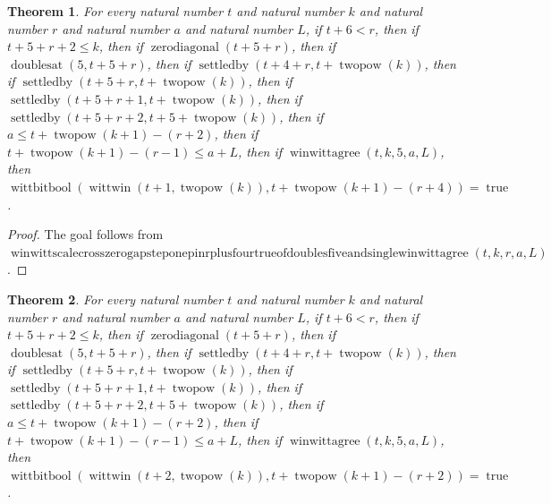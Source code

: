 \documentclass[11pt]{article}
\newtheorem{theorem}{Theorem}[section]
\theoremstyle{definition}
\begin{document}
\begin{theorem}
\label{ll:paper:winwitt-scale-cross-zero-gap-step-one-pin-r-plus-four-true-of-doubles-five-and-single-winwittagree}
For every natural number \(t\) and natural number \(k\) and natural number \(r\) and natural number \(a\) and natural number \(L\), if \(t + 6 < r\), then if \(t + 5 + r + 2 \le k\), then if \(\operatorname{zerodiagonal}(t + 5 + r)\), then if \(\operatorname{doublesat}(5, t + 5 + r)\), then if \(\operatorname{settledby}(t + 4 + r, t + \operatorname{twopow}(k))\), then if \(\operatorname{settledby}(t + 5 + r, t + \operatorname{twopow}(k))\), then if \(\operatorname{settledby}(t + 5 + r + 1, t + \operatorname{twopow}(k))\), then if \(\operatorname{settledby}(t + 5 + r + 2, t + 5 + \operatorname{twopow}(k))\), then if \(a \le t + \operatorname{twopow}(k + 1) - (r + 2)\), then if \(t + \operatorname{twopow}(k + 1) - (r - 1) \le a + L\), then if \(\operatorname{winwittagree}(t, k, 5, a, L)\), then \(\operatorname{wittbitbool}(\operatorname{wittwin}(t + 1, \operatorname{twopow}(k)), t + \operatorname{twopow}(k + 1) - (r + 4)) = \operatorname{true}\).
\end{theorem}
\begin{proof}
The goal follows from \(\operatorname{winwittscalecrosszerogapsteponepinrplusfourtrueofdoublesfiveandsinglewinwittagree}(t, k, r, a, L)\).
\end{proof}
\begin{theorem}
\label{ll:paper:winwitt-scale-cross-zero-gap-step-two-pin-r-plus-two-true-of-doubles-five-and-single-winwittagree}
For every natural number \(t\) and natural number \(k\) and natural number \(r\) and natural number \(a\) and natural number \(L\), if \(t + 6 < r\), then if \(t + 5 + r + 2 \le k\), then if \(\operatorname{zerodiagonal}(t + 5 + r)\), then if \(\operatorname{doublesat}(5, t + 5 + r)\), then if \(\operatorname{settledby}(t + 4 + r, t + \operatorname{twopow}(k))\), then if \(\operatorname{settledby}(t + 5 + r, t + \operatorname{twopow}(k))\), then if \(\operatorname{settledby}(t + 5 + r + 1, t + \operatorname{twopow}(k))\), then if \(\operatorname{settledby}(t + 5 + r + 2, t + 5 + \operatorname{twopow}(k))\), then if \(a \le t + \operatorname{twopow}(k + 1) - (r + 2)\), then if \(t + \operatorname{twopow}(k + 1) - (r - 1) \le a + L\), then if \(\operatorname{winwittagree}(t, k, 5, a, L)\), then \(\operatorname{wittbitbool}(\operatorname{wittwin}(t + 2, \operatorname{twopow}(k)), t + \operatorname{twopow}(k + 1) - (r + 2)) = \operatorname{true}\).
\end{theorem}
\end{document}
